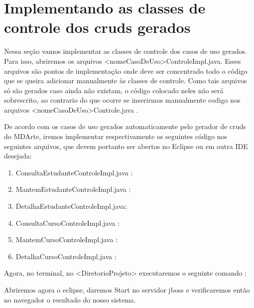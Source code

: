 \section{Implementando as classes de controle dos cruds gerados}

Nessa seção vamos implementar as classes de controle dos casos de uso gerados. Para isso, abriremos os arquivos <nomeCasoDeUso>ControleImpl.java. Esses arquivos são pontos de implementação onde deve ser concentrado todo o código que se queira adicionar manualmente às classes de controle. Como tais arquivos só são gerados caso ainda não existam, o código colocado neles não será sobrescrito, ao contrario do que ocorre se inserirmos manualmente codigo nos arquivos <nomeCasoDeUso>Controle.java .

De acordo com os casos de uso gerados automaticamente pelo gerador de cruds do MDArte, iremos implementar respectivamente os seguintes código nos seguintes arquivos, que devem portanto ser abertos no Eclipse ou em outra IDE desejada:

\begin{enumerate}
\item ConsultaEstudanteControleImpl.java :
\begin{framed}
	
\end{framed}
		
\item MantemEstudanteControleImpl.java :
\begin{framed}
	
\end{framed}

\item DetalhaEstudanteControleImpl.java:
\begin{framed}
	
\end{framed}

\item ConsultaCursoControleImpl.java :
\begin{framed}
	
\end{framed}

\item MantemCursoControleImpl.java :
\begin{framed}
	
\end{framed}

\item DetalhaCursoControleImpl.java :
\begin{framed}
	
\end{framed}

\end{enumerate}

Agora, no terminal, no <DiretorioProjeto> executaremos o seguinte comando :

\begin{framed}
	
\end{framed}

Abriremos agora o eclipse, daremos Start no servidor jboss e verificaremos então no navegador o resultado do nosso sistema.